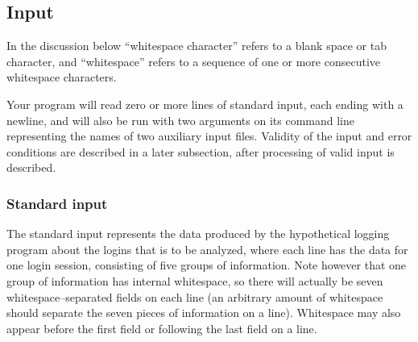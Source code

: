 \documentclass[11pt]{article}
\begin{document}
    \subsection{Input}

      In the discussion below ``whitespace character'' refers to a blank space
    or tab character, and ``whitespace'' refers to a sequence of one or more
    consecutive whitespace characters.

      Your program will read zero or more lines of standard input, each ending
    with a newline, and will also be run with two arguments on its command
    line representing the names of two auxiliary input files.  Validity of
    the input and error conditions are described in a later subsection,
    after processing of valid input is described.

      \subsubsection{Standard input}

        The standard input represents the data produced by the hypothetical
      logging program about the logins that is to be analyzed, where each
      line has the data for one login session, consisting of five groups of
      information.  Note however that one group of information has internal
      whitespace, so there will actually be seven whitespace--separated
      fields on each line (an arbitrary amount of whitespace should separate
      the seven pieces of information on a line).  Whitespace may also
      appear before the first field or following the last field on a line.

        \enlargethispage{3mm}

        \vspace{-2.5mm}
\end{document}
